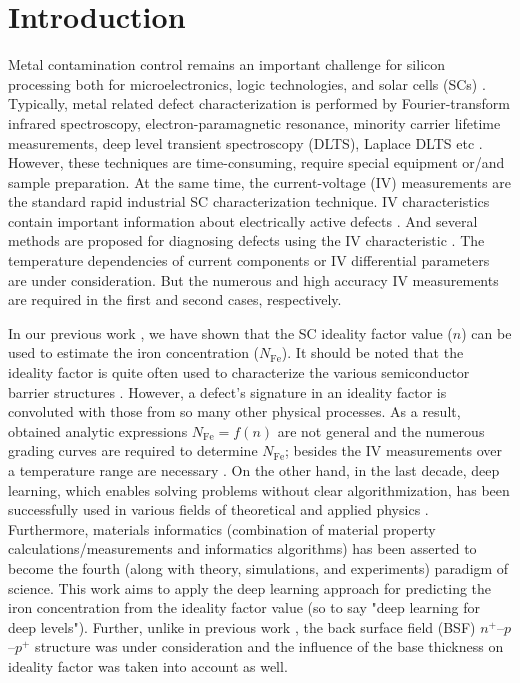 \documentclass[num-refs]{wiley-article} %
\begin{document}
\section{Introduction}\label{sec:intro}
Metal  contamination control remains an important challenge for silicon processing both for microelectronics, logic technologies, and solar cells (SCs) \cite{Claers2018,ZHU2016192,FeB:Schmidt,IronSC}.
Typically, metal related defect characterization is performed by Fourier-transform infrared spectroscopy,
electron-paramagnetic resonance,
minority carrier lifetime measurements,
deep level transient spectroscopy (DLTS),
Laplace DLTS etc \cite{Schroder2006,HowMuchPhysics,LaplDLTS}.
However, these techniques are time-consuming, require special equipment or/and sample preparation.
At the same time, the current-voltage (IV) measurements are the  standard  rapid industrial SC characterization technique.
IV characteristics contain important information about electrically active defects \cite{HowMuchPhysics,BulyarJAP}.
And several methods are proposed for diagnosing defects using the IV characteristic
\cite{HowMuchPhysics,BulyarJAP,BulyarSSE,Claeys2019,simoen2007}.
The temperature dependencies of current components \cite{Claeys2019,simoen2007}
or IV differential parameters \cite{BulyarJAP,BulyarSSE} are under consideration.
But the numerous and high accuracy IV measurements are required in the first and second cases, respectively.

In our previous work \cite{Olikh2019SM}, we have shown that the SC ideality factor value ($n$) can be used to estimate the iron concentration ($N_{\mathrm{Fe}}$).
It should be noted that the ideality factor is quite often  used to characterize the various
semiconductor barrier structures \cite{Heide,Duan,n_CharGaN,n_CharSemic,n_CharPhysRevAppl}.
However, a defect's signature in an ideality factor is convoluted with those from so many other physical processes.
As a result, obtained analytic expressions $N_{\mathrm{Fe}}=f(n)$ are not general and the numerous grading curves are required to determine $N_{\mathrm{Fe}}$;
besides the IV measurements over a temperature range are necessary \cite{Olikh2019SM}.
On the other hand, in the last decade, deep learning, which enables solving problems without clear algorithmization, has been successfully used in various fields of theoretical and applied physics  \cite{MachLean_RevModPhys,MachLeanJAP,MachLeanPPV}.
Furthermore, materials informatics
(combination of material property calculations/measurements and informatics algorithms)
has been asserted \cite{MI_JAP} to become the fourth (along with theory, simulations, and experiments) paradigm of science.
This work aims to apply the deep learning approach for predicting the iron concentration from the ideality factor value
(so to say "deep learning for deep levels").
Further, unlike in previous work \cite{Olikh2019SM}, the back surface field (BSF) $n^+$--$p$--$p^+$ structure was under consideration
and the influence of the base thickness on ideality factor was taken into account as well.
\end{document}
